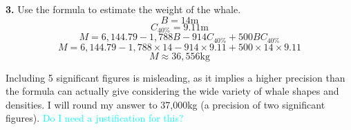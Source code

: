 \documentclass[fleqn]{article}
\newcommand{\unit}[1]{\ensuremath{\mathrm{#1}}}
\newcommand\ask[1]{\textcolor{cyan}{#1}}
\begin{document}
\vbox{
  \textbf{3.} Use the formula to estimate the weight of the whale.
  \begin{equation*}
    B = 14\unit{m}
  \end{equation*}
  \begin{equation*}
    C_{40\%} = 9.11\unit{m}
  \end{equation*}
  \begin{equation*}
    M = 6,144.79 - 1,788B - 914C_{40\%}+500BC_{40\%}
  \end{equation*}
  \begin{equation*}
    M = 6,144.79 - 1,788 \times 14 - 914 \times 9.11 + 500 \times 14 \times 9.11
  \end{equation*}
  \begin{equation*}
    M \approx 36,556 \unit{kg}
  \end{equation*}
}

  Including 5 significant figures is misleading, as it implies a higher precision than the formula can actually give considering the wide variety of whale shapes and densities. I will round my answer to 37,000kg (a precision of two significant figures). \ask{Do I need a justification for this?}
\end{document}
